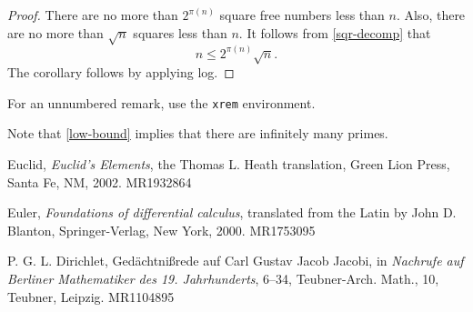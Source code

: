 \documentclass{rhumj_new}
\begin{document}
\begin{proof} There are no more than $2^{\pi(n)}$ square free numbers less than $n$. Also, there are no more than $\sqrt{n}$ squares less than $n$. It follows from \cref{sqr-decomp} that 
\[ n \leq 2^{\pi(n)} \sqrt{n}.\]
The corollary follows by applying log.
\end{proof}

For an unnumbered remark, use the \texttt{xrem} environment.
\begin{xrem} Note that \cref{low-bound} implies that there are infinitely many primes.
\end{xrem}

\begin{thebibliography}{10}


Euclid, {\it Euclid's {\it Elements}}, the Thomas L. Heath translation, Green Lion Press, Santa Fe, NM, 2002. MR1932864

Euler, {\it Foundations of differential calculus}, translated from the Latin by John D. Blanton, Springer-Verlag, New York, 2000. MR1753095

P. G. L. Dirichlet, Ged\"{a}chtni\ss rede auf Carl Gustav Jacob Jacobi, in {\it Nachrufe auf Berliner Mathematiker des 19. Jahrhunderts}, 6--34, Teubner-Arch. Math., 10, Teubner, Leipzig. MR1104895

\end{thebibliography}
\end{document}
